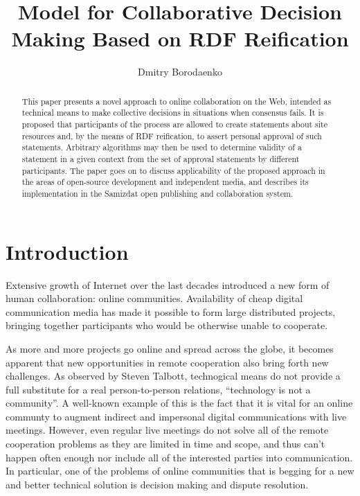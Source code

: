 \documentclass{llncs}
\begin{document}
\mainmatter              %
%
\title{Model for Collaborative Decision Making Based on RDF Reification}
%
\author{Dmitry Borodaenko}
%

\maketitle              %

\begin{abstract}
This paper presents a novel approach to online collaboration on the Web,
intended as technical means to make collective decisions in situations when
consensus fails. It is proposed that participants of the process are allowed
to create statements about site resources and, by the means of RDF
reification, to assert personal approval of such statements. Arbitrary
algorithms may then be used to determine validity of a statement in a given
context from the set of approval statements by different participants. The
paper goes on to discuss applicability of the proposed approach in the areas
of open-source development and independent media, and describes its
implementation in the Samizdat open publishing and collaboration system.
\end{abstract}


\section{Introduction}

Extensive growth of Internet over the last decades introduced a new form of
human collaboration: online communities. Availability of cheap digital
communication media has made it possible to form large distributed projects,
bringing together participants who would be otherwise unable to cooperate.

As more and more projects go online and spread across the globe, it becomes
apparent that new opportunities in remote cooperation also bring forth new
challenges. As observed by Steven Talbott\cite{fdnc}, technogical means do not
provide a full substitute for a real person-to-person relations, ``technology
is not a community''. A well-known example of this is the fact that it is
vital for an online communty to augment indirect and impersonal digital
communications with live meetings. However, even regular live meetings do not
solve all of the remote cooperation problems as they are limited in time and
scope, and thus can't happen often enough nor include all of the interested
parties into communication. In particular, one of the problems of online
communities that is begging for a new and better technical solution is
decision making and dispute resolution.
\end{document}
